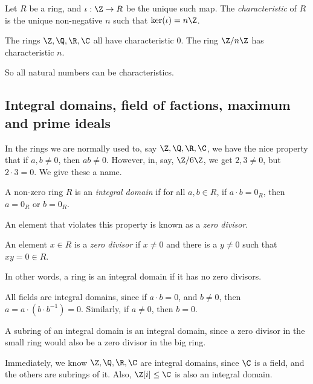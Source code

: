 \documentclass[a4paper]{article}
\begin{document}
\begin{defi}
  Let $R$ be a ring, and $\iota: \Z \to R$ be the unique such map. The \emph{characteristic} of $R$ is the unique non-negative $n$ such that $\ker (\iota) = n\Z$.
\end{defi}

\begin{eg}
  The rings $\Z, \Q, \R, \C$ all have characteristic $0$. The ring $\Z / n\Z$ has characteristic $n$.
\end{eg}
So all natural numbers can be characteristics.

\subsection{Integral domains, field of factions, maximum and prime ideals}
In the rings we are normally used to, say $\Z, \Q, \R, \C$, we have the nice property that if $a, b \not= 0$, then $ab \not= 0$. However, in, say, $\Z/6\Z$, we get $2, 3 \not= 0$, but $2 \cdot 3 = 0$. We give these a name.

\begin{defi}
  A non-zero ring $R$ is an \emph{integral domain} if for all $a, b \in R$, if $a \cdot b = 0_R$, then $a = 0_R$ or $b = 0_R$.
\end{defi}

An element that violates this property is known as a \emph{zero divisor}.

\begin{defi}
  An element $x \in R$ is a \emph{zero divisor} if $x \not = 0$ and there is a $y \not= 0$ such that $xy = 0 \in R$.
\end{defi}
In other words, a ring is an integral domain if it has no zero divisors.

\begin{eg}
  All fields are integral domains, since if $a \cdot b = 0$, and $b \not= 0$, then $a = a\cdot (b\cdot b^{-1}) = 0$. Similarly, if $a\not= 0$, then $b = 0$.
\end{eg}

\begin{eg}
  A subring of an integral domain is an integral domain, since a zero divisor in the small ring would also be a zero divisor in the big ring.
\end{eg}

\begin{eg}
  Immediately, we know $\Z, \Q, \R, \C$ are integral domains, since $\C$ is a field, and the others are subrings of it. Also, $\Z[i] \leq \C$ is also an integral domain.
\end{eg}
\end{document}
